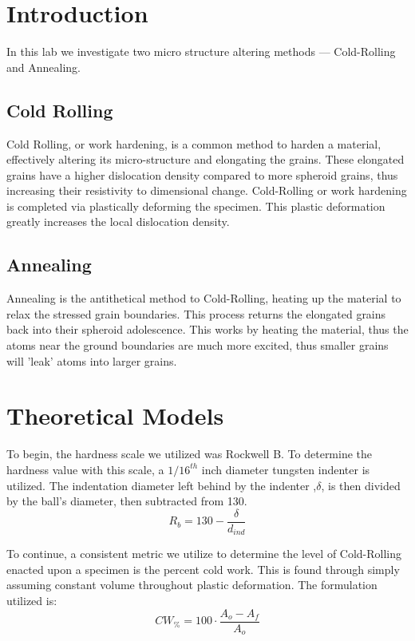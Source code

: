 \documentclass{article}
\begin{document}
\section{Introduction}
In this lab we investigate two micro structure altering methods --- Cold-Rolling and Annealing. 
\subsection{Cold Rolling}
Cold Rolling, or work hardening, is a common method to harden a material, effectively altering its micro-structure and elongating the grains. These elongated grains have a higher dislocation density compared to more spheroid grains, thus increasing their resistivity to dimensional change. Cold-Rolling or work hardening is completed via plastically deforming the specimen. This plastic deformation greatly increases the local dislocation density. 
\subsection{Annealing}
Annealing is the antithetical method to Cold-Rolling, heating up the material to relax the stressed grain boundaries. This process returns the elongated grains back into their spheroid adolescence.  This works by heating the material, thus the atoms near the ground boundaries are much more excited, thus smaller grains will 'leak' atoms into larger grains. 

\section{Theoretical Models}

To begin, the hardness scale we utilized was Rockwell B. To determine the hardness value with this scale, a $1/16^{th}$ inch diameter tungsten indenter is utilized. The indentation diameter left behind by the indenter ,$\delta$, is then divided by the ball's diameter, then subtracted from 130. 
\begin{equation}
    R_b = 130 - \frac{\delta}{d_{ind}}
    \label{rb_def}
\end{equation}

To continue, a consistent metric we utilize to determine the level of Cold-Rolling enacted upon a specimen is the percent cold work. This is found through simply assuming constant volume throughout plastic deformation. The formulation utilized is:
\begin{equation}
    CW_{\%} = 100\cdot\frac{A_o - A_f}{A_o}
    \label{CWdef}
\end{equation}
\end{document}
